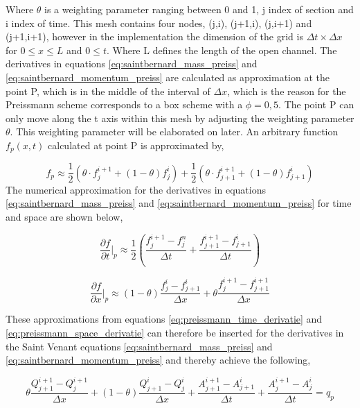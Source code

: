 Where $\theta$ is a weighting parameter ranging between 0 and 1, j index of section and i index of time. This mesh contains four nodes, (j,i), (j+1,i), (j,i+1) and (j+1,i+1), however in the implementation the dimension of the grid is $\Delta t \times \Delta x$ for $0 \leq x \leq L$ and $0\leq t$. Where L defines the length of the open channel. The derivatives in equations \ref{eq:saintbernard_mass_preiss} and \ref{eq:saintbernard_momentum_preiss} are calculated as approximation at the point P, which is in the middle of the interval of $\Delta x$, which is the reason for the Preissmann scheme corresponds to a box scheme with a $\phi =0,5$. The point P can only move along the t axis within this mesh by adjusting the weighting parameter $\theta$. This weighting parameter will be elaborated on later. An arbitrary function $f_p(x,t)$ calculated at point P is approximated by, 

\begin{equation}\label{eq:approximated_function}
	f_p \approx \frac{1}{2} (\theta \cdot f_j^{i+1}+(1-\theta)f_j^i)+\frac{1}{2}(\theta\cdot f_{j+1}^{i+1}+(1-\theta)f_{j+1}^i)
\end{equation}
The numerical approximation for the derivatives in equations \ref{eq:saintbernard_mass_preiss} and \ref{eq:saintbernard_momentum_preiss} for time and space are shown below, 

\begin{equation}\label{eq:preissmann_time_derivatie}
	\frac{\partial f}{\partial t}\bigg \rvert_p \approx \frac{1}{2}\left(\frac{f_j^{i+1}-f_j^n}{\Delta t}+\frac{f_{j+1}^{i+1}-f_{j+1}^i}{\Delta t}\right)
\end{equation}

\begin{equation}\label{eq:preissmann_space_derivatie}
	\frac{\partial f}{\partial x}\bigg \rvert_p \approx (1-\theta)\frac{f_j^i-f_{j+1}^i}{\Delta x}+\theta \frac{f_j^{i+1}-f_{j+1}^{i+1}}{\Delta x}
\end{equation}

These approximations from equations \ref{eq:preissmann_time_derivatie} and \ref{eq:preissmann_space_derivatie} can therefore be inserted for the derivatives in the Saint Venant equations \ref{eq:saintbernard_mass_preiss} and \ref{eq:saintbernard_momentum_preiss} and thereby achieve the following, 

\begin{equation}\label{eq:continuity_eq_preissmann}
	\theta \frac{Q_{j+1}^{i+1}-Q_j^{i+1}}{\Delta x}+(1-\theta)\frac{Q_{j+1}^i - Q_j^i}{\Delta x}+
	\frac{A_{j+1}^{i+1}-A_{j+1}^i}{\Delta t}+\frac{A_{j}^{i+1} - A_j^i}{\Delta t} = q_p
\end{equation}

